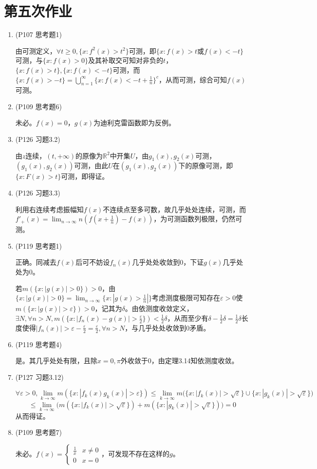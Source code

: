 \documentclass[a4paper,UTF8,fontset=windows]{ctexart}
\begin{document}
\section{第五次作业}
\begin{enumerate}
    \item (P107 思考题1)
    
    由可测定义，$\forall t\ge0, \{x:f^2(x)>t^2\}$可测，即$\{x:f(x)>t$或$f(x)<-t\}$可测，与$\{x:f(x)>0\}$及其补取交可知对非负的$t$，$\{x:f(x)>t\},\{x:f(x)<-t\}$可测，而$\{x:f(x)>-t\}=\bigcup_{n=1}^\infty\{x:f(x)<-t+\frac{1}{n}\}^c$，从而可测，综合可知$f(x)$可测。
    
    \item (P109 思考题6)
    
    未必。$f(x)=0$，$g(x)$为迪利克雷函数即为反例。
    
    \item (P126 习题3.2)
    
    由$z$连续，$(t,+\infty)$的原像为$\mathbb{R}^2$中开集$U$，由$g_1(x),g_2(x)$可测，$(g_1(x),g_2(x))$可测，由此$U$在$(g_1(x),g_2(x))$下的原像可测，即$\{x:F(x)>t\}$可测，即得证。
    
    \item (P126 习题3.3)
    
    利用右连续考虑振幅知$f(x)$不连续点至多可数，故几乎处处连续，可测，而$f'_+(x)=\lim_{n\to\infty}n(f(x+\frac{1}{n})-f(x))$，为可测函数列极限，仍然可测。
    
    \item (P119 思考题1)
    
    正确。同减去$f(x)$后可不妨设$f_n(x)$几乎处处收敛到0，下证$g(x)$几乎处处为0。
    
    若$m(\{x:|g(x)|>0\})>0$，由$\{x:|g(x)|>0\}=\lim_{n\to\infty}\{x:|g(x)>\frac{1}{n}|\}$考虑测度极限可知存在$\varepsilon>0$使$m(\{x:|g(x)|>\varepsilon\})>0$，记其为$\delta$。由依测度收敛定义，$\exists N,\forall n>N,m(\{x:|f_n(x)-g(x)|>\frac{\varepsilon}{2}\})<\frac{1}{2}\delta$，从而至少有$\delta-\frac{1}{2}\delta=\frac{1}{2}\delta$长度使得$|f_n(x)|>\varepsilon-\frac{\varepsilon}{2}=\frac{\varepsilon}{2},\forall n>N$，与几乎处处收敛到0矛盾。
    
    \item (P119 思考题4)
    
    是。其几乎处处有限，且除$x=0,\pi$外收敛于0，由定理3.14知依测度收敛。
    
    \item (P127 习题3.12)
    
    \[\forall\varepsilon>0,\lim_{k\to\infty}m(\{x:|f_k(x)g_k(x)|>\varepsilon\})\le\lim_{k\to\infty}m\big(\{x:|f_k(x)|>\sqrt\varepsilon\}\cup\{x:|g_k(x)|>\sqrt\varepsilon\}\big)\]
    \[\le\lim_{k\to\infty}\big(m(\{x:|f_k(x)|>\sqrt\varepsilon\})+m(\{x:|g_k(x)|>\sqrt\varepsilon\})\big)=0\]
    从而得证。
    
    \item (P109 思考题7)
    
    未必。$f(x)=\begin{cases}\frac{1}{x}&x\ne0\\0&x=0\end{cases}$，可发现不存在这样的$g$。    
\end{enumerate}
\end{document}
